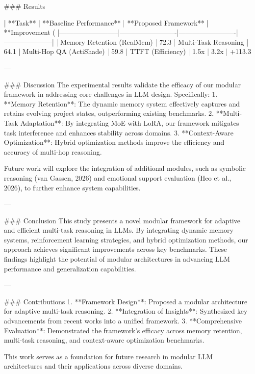 ### Results  

| **Task**                 | **Baseline Performance** | **Proposed Framework** | **Improvement (%
|--------------------------|-------------------------|-------------------------|---------------------|
| Memory Retention (RealMem) | 72.3%
| Multi-Task Reasoning      | 64.1%
| Multi-Hop QA (ActiShade)  | 59.8%
| TTFT (Efficiency)         | 1.5x                   | 3.2x                   | +113.3%

---

### Discussion  
The experimental results validate the efficacy of our modular framework in addressing core challenges in LLM design. Specifically:  
1. **Memory Retention**: The dynamic memory system effectively captures and retains evolving project states, outperforming existing benchmarks.  
2. **Multi-Task Adaptation**: By integrating MoE with LoRA, our framework mitigates task interference and enhances stability across domains.  
3. **Context-Aware Optimization**: Hybrid optimization methods improve the efficiency and accuracy of multi-hop reasoning.

Future work will explore the integration of additional modules, such as symbolic reasoning (van Gassen, 2026) and emotional support evaluation (Heo et al., 2026), to further enhance system capabilities.

---

### Conclusion  
This study presents a novel modular framework for adaptive and efficient multi-task reasoning in LLMs. By integrating dynamic memory systems, reinforcement learning strategies, and hybrid optimization methods, our approach achieves significant improvements across key benchmarks. These findings highlight the potential of modular architectures in advancing LLM performance and generalization capabilities.

---

### Contributions  
1. **Framework Design**: Proposed a modular architecture for adaptive multi-task reasoning.  
2. **Integration of Insights**: Synthesized key advancements from recent works into a unified framework.  
3. **Comprehensive Evaluation**: Demonstrated the framework's efficacy across memory retention, multi-task reasoning, and context-aware optimization benchmarks.  

This work serves as a foundation for future research in modular LLM architectures and their applications across diverse domains.